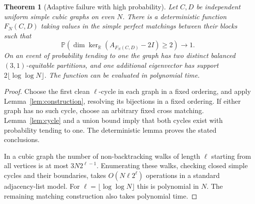 \documentclass[11pt]{article}
\newtheorem{theorem}{Theorem}
\newcommand{\Prob}{\mathbb P}
\begin{document}
\begin{theorem}[Adaptive failure with high probability]
\label{thm:adaptive}
Let $C,D$ be independent uniform simple cubic graphs on even $N$.
There is a deterministic function $F_N(C,D)$ taking values in the
simple perfect matchings between their blocks such that
\[
 \Prob\!\left(\dim\ker_{\mathbb R}
      (A_{F_N(C,D)}-2I)\ge2\right)\longrightarrow1.
\]
On an event of probability tending to one the graph has two distinct
balanced $(3,1)$-equitable partitions, and one additional eigenvector
has support $2\lfloor\log\log N\rfloor$.
The function can be evaluated in polynomial time.
\end{theorem}
\begin{proof}
Choose the first clean $\ell$-cycle in each graph in a fixed ordering,
and apply Lemma~\ref{lem:construction}, resolving its bijections in a
fixed ordering. If either graph has no such cycle, choose an arbitrary
fixed cross matching. Lemma~\ref{lem:cycle} and a union bound imply
that both cycles exist with probability tending to one. The deterministic
lemma proves the stated conclusions.

In a cubic graph the number of non-backtracking walks of length
$\ell$ starting from all vertices is at most $3N2^{\ell-1}$.
Enumerating these walks, checking closed simple cycles and their
boundaries, takes $O(N\ell2^\ell)$ operations in a standard adjacency-list
model. For $\ell=\lfloor\log\log N\rfloor$ this is polynomial in $N$.
The remaining matching construction also takes polynomial time.
\end{proof}
\end{document}
